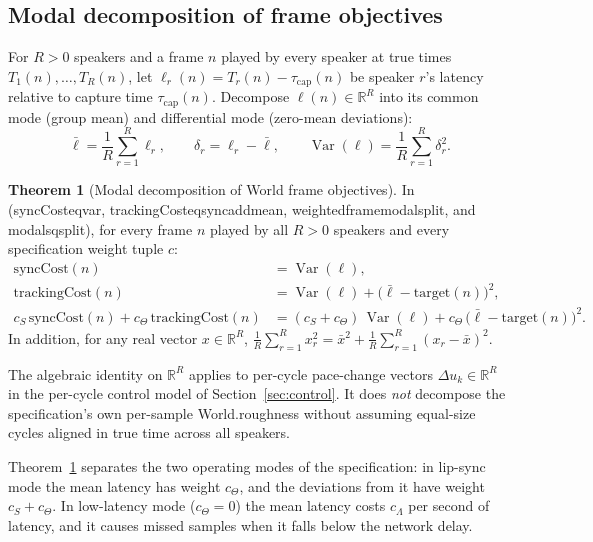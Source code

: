 \documentclass[11pt,a4paper]{article}
\DeclareRobustCommand{\lean}[1]{{\ttfamily\def\_{\textunderscore\allowbreak}#1}}
\newcommand{\R}{\mathbb{R}}
\theoremstyle{definition}
\newtheorem{theorem}[definition]{Theorem}
\begin{document}
\subsection{Modal decomposition of frame objectives}

For $R > 0$ speakers and a frame $n$ played by every speaker at true times
$T_1(n), \dots, T_R(n)$, let $\ell_r(n) = T_r(n) - \tau_{\mathrm{cap}}(n)$ be
speaker $r$'s latency relative to capture time $\tau_{\mathrm{cap}}(n)$.
Decompose $\ell(n) \in \R^R$ into its common mode (group mean) and differential
mode (zero-mean deviations):
\[
  \bar\ell = \frac{1}{R}\sum_{r=1}^R \ell_r,
  \qquad
  \delta_r = \ell_r - \bar\ell,
  \qquad
  \operatorname{Var}(\ell) = \frac{1}{R}\sum_{r=1}^R \delta_r^2 .
\]

\begin{theorem}[Modal decomposition of \lean{World} frame objectives]
\label{thm:modal-spec}
In  (\lean{syncCost\_eq\_var},
\lean{trackingCost\_eq\_sync\_add\_mean}, \lean{weighted\_frame\_modal\_split},
and \lean{modal\_sq\_split}), for every frame $n$ played by all $R > 0$
speakers and every specification weight tuple $c$:
\begin{align*}
  \mathrm{syncCost}(n) &= \operatorname{Var}(\ell), \\
  \mathrm{trackingCost}(n) &= \operatorname{Var}(\ell)
    + \bigl(\bar\ell - \mathrm{target}(n)\bigr)^2, \\
  c_S\,\mathrm{syncCost}(n) + c_\Theta\,\mathrm{trackingCost}(n)
    &= (c_S + c_\Theta)\,\operatorname{Var}(\ell)
    + c_\Theta\,\bigl(\bar\ell - \mathrm{target}(n)\bigr)^2 .
\end{align*}
In addition, for any real vector $x \in \R^R$,
$\frac{1}{R}\sum_{r=1}^R x_r^2 = \bar x^2 + \frac{1}{R}\sum_{r=1}^R (x_r - \bar x)^2$.
\end{theorem}

The algebraic identity on $\R^R$ applies to per-cycle pace-change vectors
$\Delta u_k \in \R^R$ in the per-cycle control model of
Section~\ref{sec:control}. It does \emph{not} decompose the specification's own
per-sample \lean{World.roughness} without assuming equal-size cycles aligned in
true time across all speakers.

Theorem~\ref{thm:modal-spec} separates the two operating modes of the
specification: in lip-sync mode the mean latency has weight $c_\Theta$, and the
deviations from it have weight $c_S + c_\Theta$. In low-latency mode
($c_\Theta = 0$) the mean latency costs $c_\Lambda$ per second of latency, and
it causes missed samples when it falls below the network delay.
\end{document}
